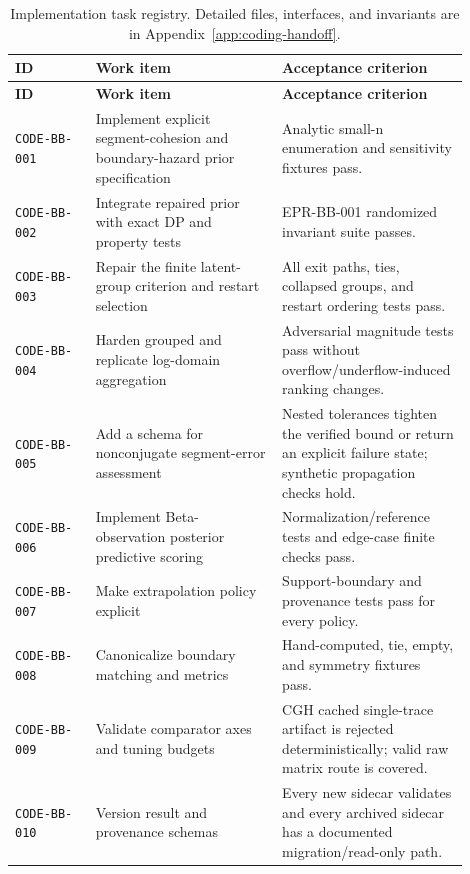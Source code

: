 \small
\begin{longtable}{@{}p{0.16\linewidth}p{0.37\linewidth}p{0.37\linewidth}@{}}
\caption{Implementation task registry. Detailed files, interfaces, and invariants are in Appendix~\ref{app:coding-handoff}.}\label{tab:code-tasks}\\
\toprule
\textbf{ID} & \textbf{Work item} & \textbf{Acceptance criterion}\\
\midrule
\endfirsthead
\toprule
\textbf{ID} & \textbf{Work item} & \textbf{Acceptance criterion}\\
\midrule
\endhead
\texttt{CODE-BB-001} & Implement explicit segment-cohesion and boundary-hazard prior specification & Analytic small-n enumeration and sensitivity fixtures pass. \\
\texttt{CODE-BB-002} & Integrate repaired prior with exact DP and property tests & EPR-BB-001 randomized invariant suite passes. \\
\texttt{CODE-BB-003} & Repair the finite latent-group criterion and restart selection & All exit paths, ties, collapsed groups, and restart ordering tests pass. \\
\texttt{CODE-BB-004} & Harden grouped and replicate log-domain aggregation & Adversarial magnitude tests pass without overflow/underflow-induced ranking changes. \\
\texttt{CODE-BB-005} & Add a schema for nonconjugate segment-error assessment & Nested tolerances tighten the verified bound or return an explicit failure state; synthetic propagation checks hold. \\
\texttt{CODE-BB-006} & Implement Beta-observation posterior predictive scoring & Normalization/reference tests and edge-case finite checks pass. \\
\texttt{CODE-BB-007} & Make extrapolation policy explicit & Support-boundary and provenance tests pass for every policy. \\
\texttt{CODE-BB-008} & Canonicalize boundary matching and metrics & Hand-computed, tie, empty, and symmetry fixtures pass. \\
\texttt{CODE-BB-009} & Validate comparator axes and tuning budgets & CGH cached single-trace artifact is rejected deterministically; valid raw matrix route is covered. \\
\texttt{CODE-BB-010} & Version result and provenance schemas & Every new sidecar validates and every archived sidecar has a documented migration/read-only path. \\

\end{longtable}
